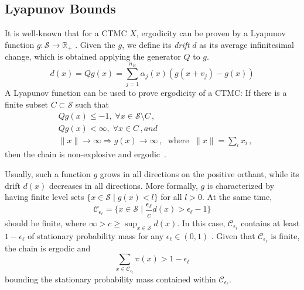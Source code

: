 \subsection{Lyapunov Bounds}\label{sec:statagg:lyapunov}
It is well-known that for a \ac{CTMC} $X$, ergodicity can be proven by a Lyapunov function $g:\mathcal{S}\to\mathbb{R}_+$ \cite{meyn1993stability,dayar2011bounding}.
Given the $g$, we define its \emph{drift} $d$ as its average infinitesimal change, which is obtained applying the generator $Q$ to $g$. 
\begin{equation}\label{eq:drift}
	d(x) = Qg(x) = \sum_{j=1}^{n_R} \alpha_j(x) (g(x+v_j) -  g(x))
\end{equation}
A Lyapunov function can be used to prove ergodicity of a \ac{CTMC}: If there is a finite subset $C\subset\mathcal{S}$ such that
\begin{align}
	&Qg(x)\leq -1,\; \forall x\in\mathcal{S}\setminus C\,,\\
	&Qg(x)< \infty,\; \forall x\in C\,, and\\
	&\lVert x\rVert\to\infty \Rightarrow g(x)\to\infty\,,\;\text{ where }\;\lVert x\rVert=\sum_i x_i\,,
\end{align}
then the chain is non-explosive and ergodic~\cite{milias2014optimization,tweedie_1975}.


Usually, such a function $g$ grows in all directions on the positive orthant, while its drift $d(x)$ decreases in all directions.
More formally, $g$ is characterized by having finite level sets $\{x\in\mathcal{S} \mid g(x) < l\}$ for all $l > 0$.
At the same time,
\begin{equation}\label{eq:lyapunov_set}
    \mathcal{C}_{\epsilon_{\ell}} = \{ x\in\mathcal{S} \mid
    \frac{\epsilon_{\ell}}{c}d(x) > \epsilon_{\ell} - 1\}
\end{equation}
should be finite, where $\infty> c\geq \sup_{x\in\mathcal{S}} d(x)$.
In this case, $\mathcal{C}_{\epsilon_{\ell}}$ contains at least $1-\epsilon_{\ell}$ of stationary probability mass for any $\epsilon_{\ell}\in(0,1)$ \cite[Thm.~8]{spieler2014numerical}.
Given that $\mathcal{C}_{\epsilon_{\ell}}$ is finite, the chain is ergodic and
\begin{equation}
    \sum_{x\in\mathcal{C}_{\epsilon_{\ell}}}\pi(x)> 1 - \epsilon_{\ell}
\end{equation}
bounding the stationary probability mass contained within $\mathcal{C}_{\epsilon_{\ell}}$.



